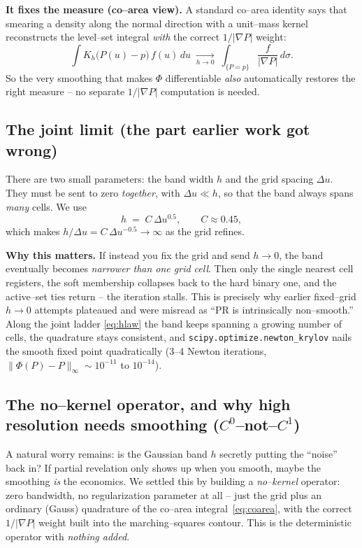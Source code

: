 \documentclass[11pt]{article}
\newcommand{\grad}{\nabla}
\begin{document}
\textbf{It fixes the measure (co--area view).} A standard co--area identity
says that smearing a density along the normal direction with a unit--mass
kernel reconstructs the level--set integral \emph{with} the correct
$1/|\grad P|$ weight:
\begin{equation}
  \int K_h\big(P(u)-p\big)\,f(u)\,du
  \;\xrightarrow[h\to0]{}\;
  \int_{\{P=p\}} \frac{f}{|\grad P|}\,d\sigma .
  \label{eq:coarea-limit}
\end{equation}
So the very smoothing that makes $\Phi$ differentiable \emph{also}
automatically restores the right measure -- no separate $1/|\grad P|$
computation is needed.

\subsection{The joint limit (the part earlier work got wrong)}

There are two small parameters: the band width $h$ and the grid spacing
$\Delta u$. They must be sent to zero \emph{together}, with $\Delta u\ll h$,
so that the band always spans \emph{many} cells. We use
\begin{equation}
  h \;=\; C\,\Delta u^{0.5}, \qquad C\approx 0.45,
  \label{eq:hlaw}
\end{equation}
which makes $h/\Delta u = C\,\Delta u^{-0.5}\to\infty$ as the grid refines.

\textbf{Why this matters.} If instead you fix the grid and send $h\to0$, the
band eventually becomes \emph{narrower than one grid cell}. Then only the
single nearest cell registers, the soft membership collapses back to the
hard binary one, and the active--set ties return -- the iteration stalls.
This is precisely why earlier fixed--grid $h\to0$ attempts plateaued and
were misread as ``PR is intrinsically non--smooth.'' Along the joint ladder
\eqref{eq:hlaw} the band keeps spanning a growing number of cells, the
quadrature stays consistent, and
\texttt{scipy.optimize.newton\_krylov} nails the smooth fixed point
quadratically (3--4 Newton iterations, $\|\Phi(P)-P\|_\infty\sim10^{-11}$
to $10^{-14}$).

\subsection{The no--kernel operator, and why high resolution needs smoothing
($C^0$--not--$C^1$)}
\label{sec:hfree}

A natural worry remains: is the Gaussian band $h$ secretly putting the
``noise'' back in? If partial revelation only shows up when you smooth, maybe
the smoothing \emph{is} the economics. We settled this by building a
\emph{no--kernel} operator: zero bandwidth, no regularization parameter at
all -- just the grid plus an ordinary (Gauss) quadrature of the co--area
integral~\eqref{eq:coarea}, with the correct $1/|\grad P|$ weight built into
the marching--squares contour. This is the deterministic operator with
\emph{nothing added}.
\end{document}
